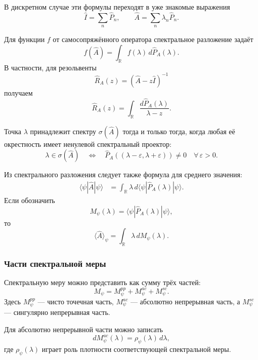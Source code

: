 \documentclass[12pt,a4paper]{article}
\begin{document}
В дискретном случае эти формулы переходят в уже знакомые выражения
\[
    \hat I=\sum_n\hat P_n,
    \qquad
    \hat A=\sum_n\lambda_n\hat P_n.
\]

Для функции $f$ от самосопряжённого оператора спектральное разложение
задаёт
\[
    \boxed{
        f(\hat A)
        =
        \int_{\mathbb R}
            f(\lambda)\,
            d\hat P_A(\lambda)
    }.
\]
В частности, для резольвенты
\[
    \hat R_A(z)
    =
    (\hat A-z\hat I)^{-1}
\]
получаем
\[
    \boxed{
        \hat R_A(z)
        =
        \int_{\mathbb R}
        \frac{d\hat P_A(\lambda)}
             {\lambda-z}
    }.
\]

Точка $\lambda$ принадлежит спектру $\sigma(\hat A)$ тогда и только
тогда, когда любая её окрестность имеет ненулевой спектральный
проектор:
\[
    \boxed{
        \lambda\in\sigma(\hat A)
        \quad\Longleftrightarrow\quad
        \hat P_A((\lambda-\varepsilon,\lambda+\varepsilon))
        \neq0
        \quad
        \forall\,\varepsilon>0
    }.
\]

Из спектрального разложения следует также формула для среднего
значения:
\[
\begin{aligned}
    \langle\psi|\hat A|\psi\rangle
    &=
    \int_{\mathbb R}
        \lambda\,
        d\langle\psi|
            \hat P_A(\lambda)
        |\psi\rangle.
\end{aligned}
\]
Если обозначить
\[
    \boxed{
        M_\psi(\lambda)
        =
        \langle\psi|
            \hat P_A(\lambda)
        |\psi\rangle
    },
\]
то
\[
    \boxed{
        \langle\hat A\rangle_\psi
        =
        \int_{\mathbb R}
            \lambda\,dM_\psi(\lambda)
    }.
\]


\subsubsection{Части спектральной меры}

Спектральную меру можно представить как сумму трёх частей:
\[
    \boxed{
        M_\psi
        =
        M_\psi^{pp}
        +
        M_\psi^{ac}
        +
        M_\psi^{sc}
    }.
\]
Здесь $M_\psi^{pp}$ --- чисто точечная часть,
$M_\psi^{ac}$ --- абсолютно непрерывная часть, а
$M_\psi^{sc}$ --- сингулярно непрерывная часть.

Для абсолютно непрерывной части можно записать
\[
    dM_\psi^{ac}(\lambda)
    =
    \rho_\psi(\lambda)\,d\lambda,
\]
где $\rho_\psi(\lambda)$ играет роль плотности соответствующей
спектральной меры.
\end{document}
